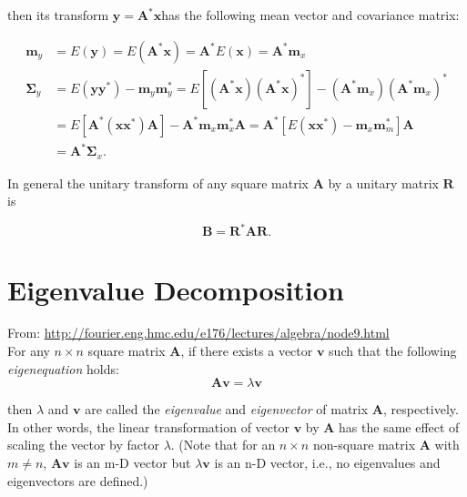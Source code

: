 \documentclass[10pt,b5paper,titlepage]{book}
\begin{document}
\begin{itemize}
        then its transform $\mathbf{y} = \mathbf{A}^{*} \mathbf{x}$has the following
        mean vector and covariance matrix:

        \begin{equation}
            \begin{array}{ll}
                \mathbf{m}_y &= E(\mathbf{y}) = E(\mathbf{A}^{*} \mathbf{x})
                              = \mathbf{A}^{*} E(\mathbf{x}) = \mathbf{A}^{*} \mathbf{m}_x \\
                \mathbf{\Sigma}_y &= E(\mathbf{y} \mathbf{y}^{*}) - \mathbf{m}_y \mathbf{m}_y^{*}
                              = E[(\mathbf{A}^{*} \mathbf{x}) (\mathbf{A}^{*} \mathbf{x})^{*}] - (\mathbf{A}^{*} \mathbf{m}_x) (\mathbf{A}^{*} \mathbf{m}_x)^{*}\\
                             &= E[\mathbf{A}^{*} (\mathbf{x} \mathbf{x}^{*}) \mathbf{A}] - \mathbf{A}^{*} \mathbf{m}_{x} \mathbf{m}_{x}^{*} \mathbf{A}
                              = \mathbf{A}^{*} [E(\mathbf{x} \mathbf{x}^{*}) - \mathbf{m}_{x} \mathbf{m}_{m}^{*}] \mathbf{A}\\
                             &= \mathbf{A}^{*} \mathbf{\Sigma}_{x} \mathbf{}.
            \end{array}
        \end{equation}

        In general the unitary transform of any square matrix $\mathbf{A}$
        by a unitary matrix $\mathbf{R}$ is

        \begin{equation}
            \mathbf{B} = \mathbf{R}^{*} \mathbf{A} \mathbf{R} 
        .\end{equation}

\end{itemize}


\chapter{Eigenvalue Decomposition}
From: \url{http://fourier.eng.hmc.edu/e176/lectures/algebra/node9.html}\\

For any $n \times n$ square matrix $\mathbf{A}$, if there exists a vector $\mathbf{v}$ such that the following \textit{eigenequation} holds:
\begin{equation}
\mathbf{A}\mathbf{v}=\lambda{}\mathbf{v}
\end{equation}

then $\lambda$ and $\mathbf{v}$ are called the \textit{eigenvalue} and \textit{eigenvector} of matrix $\mathbf{A}$, respectively. In other words, the linear transformation of vector $\mathbf{v}$ by $\mathbf{A}$ has the same effect of scaling the vector by factor $\lambda$. (Note that for an $ n\times n$ non-square matrix $\mathbf{A}$ with $m \neq n$, $\mathbf{A}\mathbf{v}$ is an m-D vector but $\lambda\mathbf{v}$ is an n-D vector, i.e., no eigenvalues and eigenvectors are defined.)\\
\end{document}
